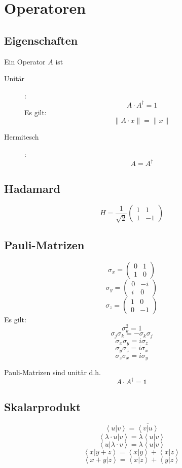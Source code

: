 \documentclass{article}
\begin{document}
\section{Operatoren}
\subsection{Eigenschaften}
Ein Operator $A$ ist
\begin{description}
\item[Unitär]:
  \[ A\cdot A^\dagger = 1 \]
  Es gilt:
  \[ \| A\cdot x \| = \| x \| \]
\item[Hermitesch]:
  \[ A = A^\dagger \]
\end{description}
\subsection{Hadamard}

\[ H = \frac{1}{\sqrt{2}}\left(\begin{array}{rr}
    1 &  1\\
    1 & -1
  \end{array}\right) \]
\subsection{Pauli-Matrizen}
\[ \sigma_x = \left(\begin{array}{rr}
    0 & 1\\
    1 & 0
  \end{array} \right) \]
\[ \sigma_y = \left(\begin{array}{rr}
    0 & -i\\
    i & 0
  \end{array} \right) \]
\[ \sigma_z = \left(\begin{array}{rr}
    1 & 0\\
    0 & -1
  \end{array}\right) \]
Es gilt:
\[ \sigma_k^2 = 1 \]
\[ \sigma_j\sigma_k = -\sigma_k\sigma_j \]
\[ \sigma_x\sigma_y = i\sigma_z \]
\[ \sigma_y\sigma_z = i\sigma_x \]
\[ \sigma_z\sigma_x = i\sigma_y \]

Pauli-Matrizen sind unitär d.h. 
\[ A \cdot A^{\dagger} = \mathbb{1} \]
\subsection{Skalarprodukt}
\[ \left<u|v\right> = \overline{\left<v|u\right>} \]
\[ \left<\lambda\cdot u|v\right> = \overline{\lambda}\left<u|v\right> \]
\[ \left<u|\lambda\cdot v\right> = \lambda\left<u|v\right> \]
\[ \left<x|y+z\right> = \left<x|y\right> + \left<x|z\right> \]
\[ \left<x+y|z\right> = \left<x|z\right> + \left<y|z\right> \]
\end{document}
